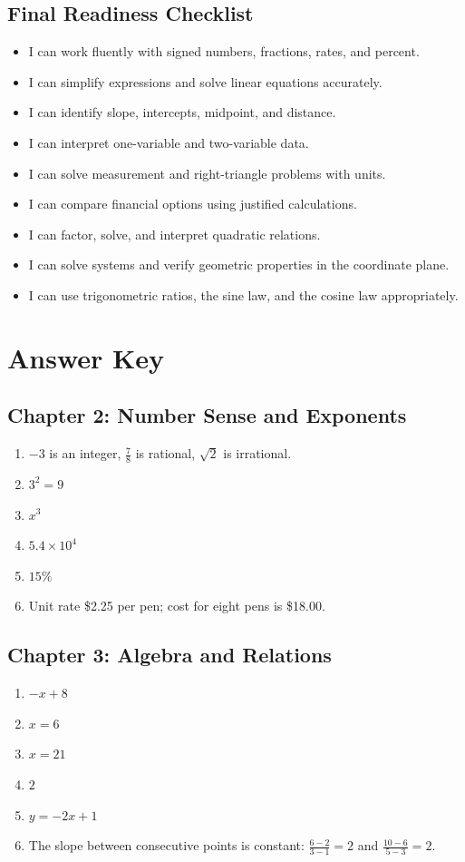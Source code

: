 \documentclass[11pt,oneside]{book}
\begin{document}
\section{Final Readiness Checklist}
\begin{itemize}
  \item I can work fluently with signed numbers, fractions, rates, and percent.
  \item I can simplify expressions and solve linear equations accurately.
  \item I can identify slope, intercepts, midpoint, and distance.
  \item I can interpret one-variable and two-variable data.
  \item I can solve measurement and right-triangle problems with units.
  \item I can compare financial options using justified calculations.
  \item I can factor, solve, and interpret quadratic relations.
  \item I can solve systems and verify geometric properties in the coordinate plane.
  \item I can use trigonometric ratios, the sine law, and the cosine law appropriately.
\end{itemize}

\backmatter

\chapter{Answer Key}
\section*{Chapter 2: Number Sense and Exponents}
\begin{enumerate}
  \item $-3$ is an integer, $\frac{7}{8}$ is rational, $\sqrt{2}$ is irrational.
  \item $3^2=9$
  \item $x^3$
  \item $5.4\times 10^4$
  \item $15\%$
  \item Unit rate \$2.25 per pen; cost for eight pens is \$18.00.
\end{enumerate}

\section*{Chapter 3: Algebra and Relations}
\begin{enumerate}
  \item $-x+8$
  \item $x=6$
  \item $x=21$
  \item $2$
  \item $y=-2x+1$
  \item The slope between consecutive points is constant: $\frac{6-2}{3-1}=2$ and $\frac{10-6}{5-3}=2$.
\end{enumerate}
\end{document}
